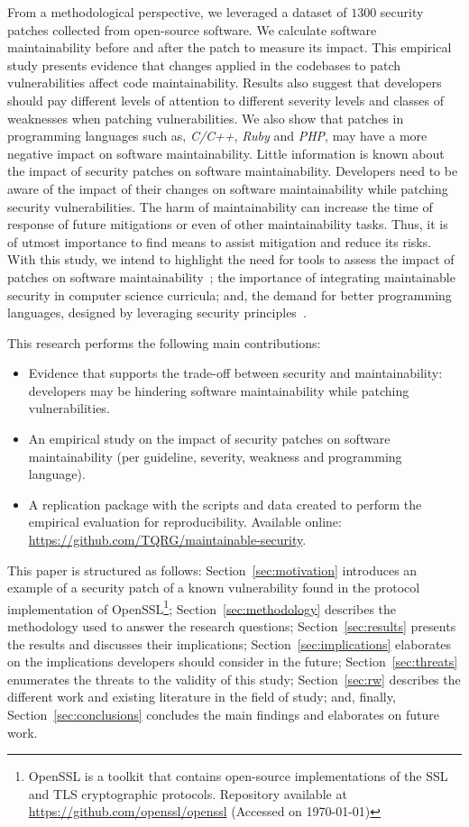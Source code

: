 \documentclass[smallextended]{svjour3}       %
\begin{document}
From a methodological perspective, we leveraged a dataset of $1300$ 
security patches collected from open-source software. We calculate 
software maintainability before and after the patch to measure its 
impact. This empirical study presents evidence that changes applied 
in the codebases to patch vulnerabilities affect code 
maintainability. Results also suggest that developers 
should pay different levels of attention to different severity 
levels and classes of weaknesses when patching vulnerabilities. We 
also show that patches in programming languages such as, 
\emph{C/C++}, \emph{Ruby} and \emph{PHP}, may have a more negative 
impact on software maintainability. Little information is known 
about the impact of security patches on software 
maintainability. Developers need to be aware of the impact of their 
changes on software maintainability while patching security 
vulnerabilities. The harm of maintainability can increase the time 
of response of future mitigations or even of other maintainability 
tasks. Thus, it is of utmost importance to find means to assist 
mitigation and reduce its risks. With this study, we intend to 
highlight the need for tools to assess the impact of patches on 
software maintainability~\cite{4724577}; the importance of 
integrating maintainable security in computer science curricula; 
and, the demand for better programming languages, designed by 
leveraging security principles~\cite{kurilova2014wyvern,10.1145/2489828.2489830}. 
 
This research performs the following main contributions:
%
\begin{itemize}
  \item Evidence that supports the trade-off between security and 
  maintainability: developers may be hindering software 
  maintainability while patching vulnerabilities.
	\item An empirical study on the impact of security patches on 
	software maintainability (per guideline, severity, weakness and 
	programming language).
	\item A replication package with the scripts and data created to 
	perform the empirical evaluation for reproducibility. Available 
	online: \url{https://github.com/TQRG/maintainable-security}.
\end{itemize}
%
This paper is structured as follows: Section~\ref{sec:motivation} 
introduces an example of a security patch of a known vulnerability 
found in the protocol implementation of 
OpenSSL\footnote{\label{openssl}OpenSSL is a toolkit that
contains open-source implementations of the SSL and TLS cryptographic
protocols. Repository available at 
\url{https://github.com/openssl/openssl} (Accessed on \today{})}; 
Section~\ref{sec:methodology} describes the methodology used to 
answer the research questions; Section~\ref{sec:results} presents 
the results and discusses their implications; 
Section~\ref{sec:implications} elaborates on the implications
developers should consider in the future; Section~\ref{sec:threats} 
enumerates the threats to the validity of this study; 
Section~\ref{sec:rw} describes the different work and existing
literature in the field of study; and, finally, 
Section~\ref{sec:conclusions} concludes the main findings and 
elaborates on future work.
\end{document}

